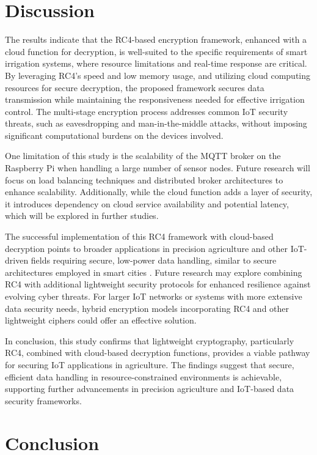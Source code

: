 \documentclass[conference]{IEEEtran}
\begin{document}
\section{Discussion}

The results indicate that the RC4-based encryption framework, enhanced with a cloud function for decryption, is well-suited to the specific requirements of smart irrigation systems, where resource limitations and real-time response are critical. By leveraging RC4's speed and low memory usage, and utilizing cloud computing resources for secure decryption, the proposed framework secures data transmission while maintaining the responsiveness needed for effective irrigation control. The multi-stage encryption process addresses common IoT security threats, such as eavesdropping and man-in-the-middle attacks, without imposing significant computational burdens on the devices involved.

One limitation of this study is the scalability of the MQTT broker on the Raspberry Pi when handling a large number of sensor nodes. Future research will focus on load balancing techniques and distributed broker architectures to enhance scalability. Additionally, while the cloud function adds a layer of security, it introduces dependency on cloud service availability and potential latency, which will be explored in further studies.

The successful implementation of this RC4 framework with cloud-based decryption points to broader applications in precision agriculture and other IoT-driven fields requiring secure, low-power data handling, similar to secure architectures employed in smart cities \cite{ref17}. Future research may explore combining RC4 with additional lightweight security protocols for enhanced resilience against evolving cyber threats. For larger IoT networks or systems with more extensive data security needs, hybrid encryption models incorporating RC4 and other lightweight ciphers could offer an effective solution.

In conclusion, this study confirms that lightweight cryptography, particularly RC4, combined with cloud-based decryption functions, provides a viable pathway for securing IoT applications in agriculture. The findings suggest that secure, efficient data handling in resource-constrained environments is achievable, supporting further advancements in precision agriculture and IoT-based data security frameworks.

\section{Conclusion}
\end{document}
